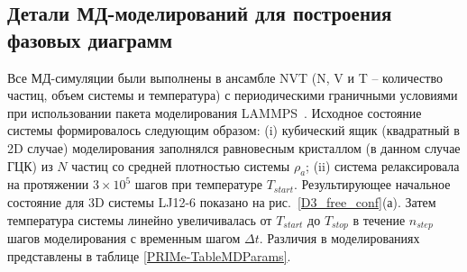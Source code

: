 \subsection{Детали МД-моделирований для построения фазовых диаграмм}
\label{PRIMe-SubSecPhaseDiagramMDDetails}



Все МД-симуляции были выполнены в ансамбле NVT (N, V и T -- количество частиц, объем системы и температура) с периодическими граничными условиями при использовании пакета моделирования LAMMPS~\cite{10.1006/jcph.1995.1039}.
Исходное состояние системы формировалось следующим образом: (i) кубический ящик (квадратный в 2D случае) моделирования заполнялся равновесным кристаллом (в данном случае ГЦК) из $N$ частиц со средней плотностью системы $\rho_a$; (ii) система релаксировала на протяжении $3 \times 10^5$ шагов при температуре $T_{start}$.
Результирующее начальное состояние для 3D системы LJ12-6 показано на рис.~\ref{D3_free_conf}(а).
Затем температура системы линейно увеличивалась от $T_{start}$ до $T_{stop}$ в течение $n_{step}$ шагов моделирования с временным шагом $\Delta t$.
Различия в моделированиях представлены в таблице \ref{PRIMe-TableMDParams}.


\begin{table}[h!]
  \caption{Параметры, используемые в МД-моделировании для бимодальных расчетов:
    где $\rho$ — средняя плотность системы, $r_c$ — радиус отсечки,
    $T_{start}$ и $T_{stop}$ — начальная и конечная температуры моделирования,
    $n_{step}$ — количество шагов моделирования, а
    $\Delta t$ — временной шаг.}
  \label{PRIMe-TableMDParams}
\end{table}


